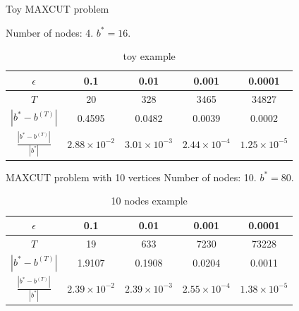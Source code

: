 \documentclass{beamer}
\begin{document}
\begin{frame}{Toy MAXCUT problem}

Number of nodes: 4. $b^* = 16$.

\begin{table}[htbp]\label{toytable}
\centering\small
\begin{tabular}{||c|c|c|c|c||}
\hline
$\epsilon $& 0.1 & 0.01 & 0.001 & 0.0001 \\
\hline
$T$ & 20 & 328 & 3465  & 34827 \\
\hline
$|b^* - b^{(T)}|$ & 0.4595 & 0.0482 & 0.0039 & 0.0002 \\
\hline 
$\frac{|b^* - b^{(T)}|}{|b^*|}$ & $2.88\times 10^{-2}$ &  $3.01\times 10^{-3}$  & $2.44\times 10^{-4}$ &  $1.25\times 10^{-5}$\\
\hline
\end{tabular}
\caption{toy example}
\end{table}
\end{frame}

\begin{frame}{MAXCUT problem with 10 vertices}
Number of nodes: 10. $b^* = 80$. 
\begin{table}[htbp]\label{10nodestable}
\centering\small

\begin{tabular}{||c|c|c|c|c||}
\hline
$\epsilon$ & 0.1 & 0.01 & 0.001 & 0.0001 \\
\hline
$T$ & 19 & 633 & 7230 & 73228 \\
\hline
$|b^* - b^{(T)}|$ & 1.9107 & 0.1908 & 0.0204 & 0.0011 \\
\hline
$\frac{|b^* - b^{(T)}|}{|b^*|}$ & $2.39\times 10^{-2}$ &  $2.39\times 10^{-3}$  & $2.55\times 10^{-4}$ &  $1.38\times 10^{-5}$\\
\hline
\end{tabular}
\caption{10 nodes example}
\end{table}
\end{frame}
\end{document}
